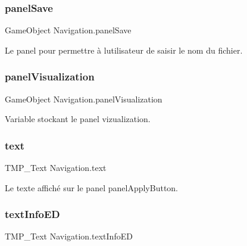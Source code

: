 \subsubsection{\texorpdfstring{panel\+Save}{panelSave}}
{\footnotesize\ttfamily Game\+Object Navigation.\+panel\+Save\hspace{0.3cm}{\ttfamily [private]}}



Le panel pour permettre à l\textquotesingle{}utilisateur de saisir le nom du fichier. 

\mbox{\label{class_navigation_a87c0235e826c5cd805b95b81c8c55ceb}} 
\subsubsection{\texorpdfstring{panel\+Visualization}{panelVisualization}}
{\footnotesize\ttfamily Game\+Object Navigation.\+panel\+Visualization\hspace{0.3cm}{\ttfamily [private]}}



Variable stockant le panel vizualization. 

\mbox{\label{class_navigation_ac6f0605a263e970630f2946dbc8f5ca3}} 
\subsubsection{\texorpdfstring{text}{text}}
{\footnotesize\ttfamily T\+M\+P\+\_\+\+Text Navigation.\+text\hspace{0.3cm}{\ttfamily [private]}}



Le texte affiché sur le panel panel\+Apply\+Button. 

\mbox{\label{class_navigation_af2ad653f49a97486583aa60103af3e6d}} 
\subsubsection{\texorpdfstring{text\+Info\+ED}{textInfoED}}
{\footnotesize\ttfamily T\+M\+P\+\_\+\+Text Navigation.\+text\+Info\+ED\hspace{0.3cm}{\ttfamily [private]}}



